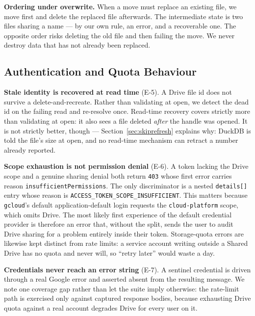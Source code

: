 \documentclass[sigconf, nonacm]{acmart}
\newcommand{\expref}[1]{\textsf{E-#1}}
\begin{document}
\textbf{Ordering under overwrite.} When a move must replace an existing file,
we move first and delete the replaced file afterwards. The intermediate state
is two files sharing a name --- by our own rule, an error, and a recoverable
one. The opposite order risks deleting the old file and then failing the move.
We never destroy data that has not already been replaced.

\subsection{Authentication and Quota Behaviour}

\textbf{Stale identity is recovered at read time} (\expref{5}). A Drive file id
does not survive a delete-and-recreate. Rather than validating at open, we
detect the dead id on the failing read and re-resolve once. Read-time recovery
covers strictly more than validating at open: it also sees a file deleted
\emph{after} the handle was opened. It is not strictly better, though ---
Section~\ref{sec:skiprefresh} explains why: DuckDB is told the file's size at
open, and no read-time mechanism can retract a number already reported.

\textbf{Scope exhaustion is not permission denial} (\expref{6}). A token
lacking the Drive scope and a genuine sharing denial both return \texttt{403}
whose first error carries reason
\texttt{insufficient\-Permissions}. The only discriminator is a nested
\texttt{details[]} entry whose reason is
\texttt{ACCESS\_\allowbreak{}TOKEN\_\allowbreak{}SCOPE\_\allowbreak{}INSUFFICIENT}.
This matters because \texttt{gcloud}'s default
application-default login requests the \texttt{cloud-platform} scope, which
omits Drive. The most likely first experience of the default credential
provider is therefore an error that, without the split, sends the user to
audit Drive sharing for a problem entirely inside their token. Storage-quota
errors are likewise kept distinct from rate limits:
a service account writing outside a Shared Drive has no quota and never will,
so ``retry later'' would waste a day.

\textbf{Credentials never reach an error string} (\expref{7}). A sentinel
credential is driven through a real Google error and asserted absent from the
resulting message. We note one coverage gap rather than let the suite imply
otherwise: the rate-limit path is exercised only against captured response
bodies, because exhausting Drive quota against a real account degrades Drive
for every user on it.
\end{document}
